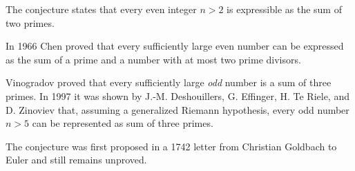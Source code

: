 \documentclass[12pt]{article}
\begin{document}
The conjecture states that every even integer $n>2$ is expressible as the sum of two primes.

In 1966 Chen proved that every sufficiently large even number can be expressed as the sum of a prime and a number with at most two prime divisors.

Vinogradov proved that every sufficiently large \emph{odd} number is a sum of three primes. In 1997 it was shown by J.-M. Deshouillers, G. Effinger, H. Te Riele, and D. Zinoviev that, assuming a generalized Riemann hypothesis, every odd number $n>5$ can be represented as sum of three primes.

The conjecture was first proposed in a 1742 letter from Christian Goldbach to Euler and still remains unproved.
\end{document}
